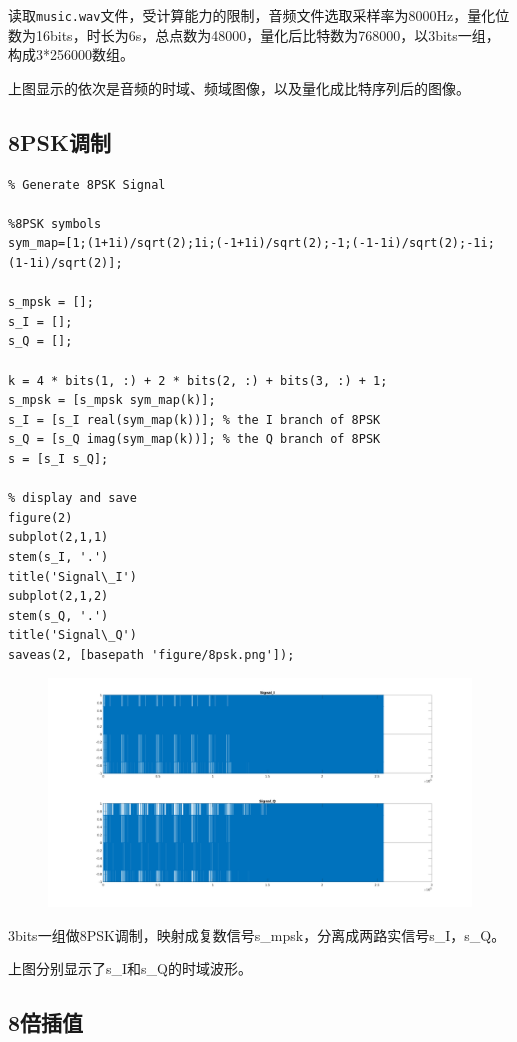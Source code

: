 \begin{spacing}{1.5}
读取\verb|music.wav|文件，受计算能力的限制，音频文件选取采样率为8000Hz，量化位数为16bits，时长为6s，总点数为48000，量化后比特数为768000，以3bits一组，构成3*256000数组。

上图显示的依次是音频的时域、频域图像，以及量化成比特序列后的图像。

\subsection{8PSK调制}

\begin{lstlisting}
% Generate 8PSK Signal

%8PSK symbols
sym_map=[1;(1+1i)/sqrt(2);1i;(-1+1i)/sqrt(2);-1;(-1-1i)/sqrt(2);-1i;(1-1i)/sqrt(2)]; 

s_mpsk = [];
s_I = [];
s_Q = [];

k = 4 * bits(1, :) + 2 * bits(2, :) + bits(3, :) + 1;
s_mpsk = [s_mpsk sym_map(k)];
s_I = [s_I real(sym_map(k))]; % the I branch of 8PSK
s_Q = [s_Q imag(sym_map(k))]; % the Q branch of 8PSK
s = [s_I s_Q];

% display and save
figure(2)
subplot(2,1,1)
stem(s_I, '.')
title('Signal\_I')
subplot(2,1,2)
stem(s_Q, '.')
title('Signal\_Q')
saveas(2, [basepath 'figure/8psk.png']);
\end{lstlisting}

\begin{figure}[H]
\centering
\includegraphics[width = \columnwidth]{8psk.png}
\end{figure}

3bits一组做8PSK调制，映射成复数信号s\_mpsk，分离成两路实信号s\_I，s\_Q。

上图分别显示了s\_I和s\_Q的时域波形。

\subsection{8倍插值}


\end{spacing}
